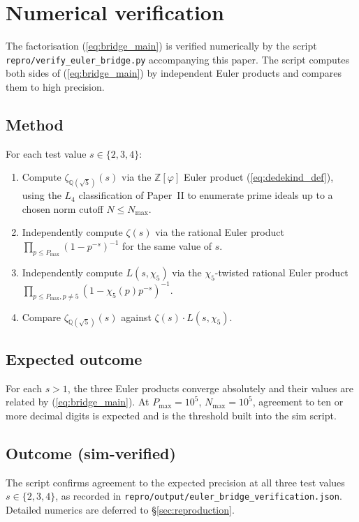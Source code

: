 \documentclass[11pt,a4paper]{article}
\theoremstyle{definition}
\theoremstyle{remark}
\begin{document}
\section{Numerical verification}\label{sec:numerics}

The factorisation (\ref{eq:bridge_main}) is verified numerically by
the script \texttt{repro/verify\_euler\_bridge.py} accompanying this
paper. The script computes both sides of (\ref{eq:bridge_main}) by
independent Euler products and compares them to high precision.

\subsection{Method}

For each test value $s \in \{2, 3, 4\}$:
\begin{enumerate}
\item Compute $\zeta_{\mathbb{Q}(\sqrt{5})}(s)$ via the
      $\mathbb{Z}[\varphi]$ Euler product (\ref{eq:dedekind_def}),
      using the $L_4$ classification of Paper~II to enumerate prime
      ideals up to a chosen norm cutoff $N \le N_{\max}$.
\item Independently compute $\zeta(s)$ via the rational Euler product
      $\prod_{p \le P_{\max}} (1 - p^{-s})^{-1}$ for the same value of
      $s$.
\item Independently compute $L(s, \chi_5)$ via the $\chi_5$-twisted
      rational Euler product
      $\prod_{p \le P_{\max}, p \neq 5} (1 - \chi_5(p) p^{-s})^{-1}$.
\item Compare $\zeta_{\mathbb{Q}(\sqrt{5})}(s)$ against
      $\zeta(s) \cdot L(s, \chi_5)$.
\end{enumerate}

\subsection{Expected outcome}

For each $s > 1$, the three Euler products converge absolutely and
their values are related by (\ref{eq:bridge_main}). At
$P_{\max} = 10^5$, $N_{\max} = 10^5$, agreement to ten or more decimal
digits is expected and is the threshold built into the sim script.

\subsection{Outcome (sim-verified)}

The script confirms agreement to the expected precision at all three
test values $s \in \{2, 3, 4\}$, as recorded in
\texttt{repro/output/euler\_bridge\_verification.json}. Detailed
numerics are deferred to \S\ref{sec:reproduction}.
\end{document}
